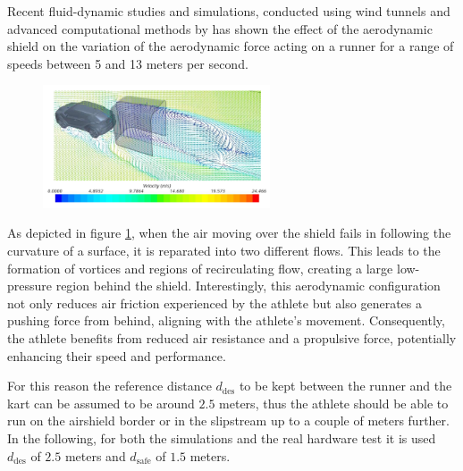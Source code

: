 \documentclass[a4paper,12pt,oneside]{book}
\begin{document}
\bigskip
Recent fluid-dynamic studies and simulations, conducted using wind tunnels and advanced computational methods by \cite{Coni_article} has shown the effect of the aerodynamic shield on the variation of the aerodynamic force acting on a runner for a range of speeds between 5 and 13 meters per second.

\begin{figure}[h!]
	\centering
	\includegraphics[width=0.6\textwidth]{Aerodynamics.png}
	\caption{}
	\label{image:Aerodynamic_studies}
\end{figure}

As depicted in figure \ref{image:Aerodynamic_studies}, when the air moving over the shield fails in following the curvature of a surface, it is reparated into two different flows.
This leads to the formation of vortices and regions of recirculating flow, creating a large low-pressure region behind the shield.
Interestingly, this aerodynamic configuration not only reduces air friction experienced by the athlete but also generates a pushing force from behind, aligning with the athlete's movement. Consequently, the athlete benefits from reduced air resistance and a propulsive force, potentially enhancing their speed and performance.

\bigskip
For this reason the reference distance $d_{\text{des}}$ to be kept between the runner and the kart can be assumed to be around $2.5$ meters, thus the athlete should be able to run on the airshield border or in the slipstream up to a couple of meters further.
In the following, for both the simulations and the real hardware test it is used $d_\text{des}$ of $2.5$ meters and $d_\text{safe}$ of $1.5$ meters.
\end{document}
